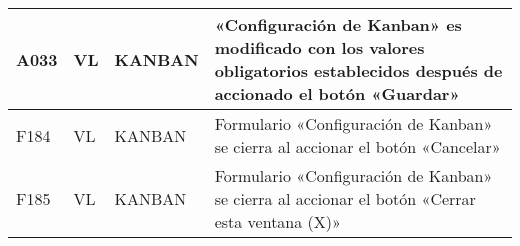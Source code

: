 \begin{landscape}
\begin{longtable}[htb]{|l|l|p{5.0cm}|p{13.0cm}|}
A033 & VL & KANBAN & «Configuración de Kanban» es modificado con los valores obligatorios establecidos después de accionado el botón «Guardar» \\ \hline
F184 & VL & KANBAN & Formulario «Configuración de Kanban» se cierra al accionar el botón «Cancelar» \\ \hline
F185 & VL & KANBAN & Formulario «Configuración de Kanban» se cierra al accionar el botón «Cerrar esta ventana (X)» \\ \hline
\end{longtable}
\end{landscape}

